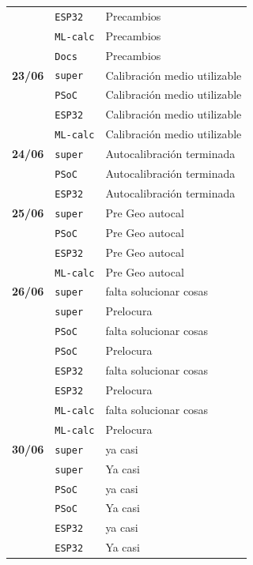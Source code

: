 \begin{longtable}{@{}p{1.7cm} p{1.5cm} p{12.2cm}@{}}
 & \texttt{\scriptsize ESP32} & Precambios \\
 & \texttt{\scriptsize ML-calc} & Precambios \\
 & \texttt{\scriptsize Docs} & Precambios \\
\textbf{23/06} & \texttt{\scriptsize super} & Calibración medio utilizable \\
 & \texttt{\scriptsize PSoC} & Calibración medio utilizable \\
 & \texttt{\scriptsize ESP32} & Calibración medio utilizable \\
 & \texttt{\scriptsize ML-calc} & Calibración medio utilizable \\
\textbf{24/06} & \texttt{\scriptsize super} & Autocalibración terminada \\
 & \texttt{\scriptsize PSoC} & Autocalibración terminada \\
 & \texttt{\scriptsize ESP32} & Autocalibración terminada \\
\textbf{25/06} & \texttt{\scriptsize super} & Pre Geo autocal \\
 & \texttt{\scriptsize PSoC} & Pre Geo autocal \\
 & \texttt{\scriptsize ESP32} & Pre Geo autocal \\
 & \texttt{\scriptsize ML-calc} & Pre Geo autocal \\
\textbf{26/06} & \texttt{\scriptsize super} & falta solucionar cosas \\
 & \texttt{\scriptsize super} & Prelocura \\
 & \texttt{\scriptsize PSoC} & falta solucionar cosas \\
 & \texttt{\scriptsize PSoC} & Prelocura \\
 & \texttt{\scriptsize ESP32} & falta solucionar cosas \\
 & \texttt{\scriptsize ESP32} & Prelocura \\
 & \texttt{\scriptsize ML-calc} & falta solucionar cosas \\
 & \texttt{\scriptsize ML-calc} & Prelocura \\
\textbf{30/06} & \texttt{\scriptsize super} & ya casi \\
 & \texttt{\scriptsize super} & Ya casi \\
 & \texttt{\scriptsize PSoC} & ya casi \\
 & \texttt{\scriptsize PSoC} & Ya casi \\
 & \texttt{\scriptsize ESP32} & ya casi \\
 & \texttt{\scriptsize ESP32} & Ya casi \\

\end{longtable}
